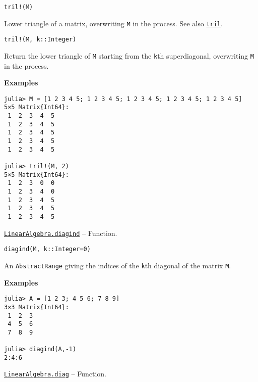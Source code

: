 \begin{adjustwidth}{2em}{0pt}


\begin{verbatim}
tril!(M)
\end{verbatim}

Lower triangle of a matrix, overwriting \texttt{M} in the process. See also \hyperlink{6919124555890239966}{\texttt{tril}}.




\begin{lstlisting}
tril!(M, k::Integer)
\end{lstlisting}

Return the lower triangle of \texttt{M} starting from the \texttt{k}th superdiagonal, overwriting \texttt{M} in the process.

\textbf{Examples}


\begin{verbatim}
julia> M = [1 2 3 4 5; 1 2 3 4 5; 1 2 3 4 5; 1 2 3 4 5; 1 2 3 4 5]
5×5 Matrix{Int64}:
 1  2  3  4  5
 1  2  3  4  5
 1  2  3  4  5
 1  2  3  4  5
 1  2  3  4  5

julia> tril!(M, 2)
5×5 Matrix{Int64}:
 1  2  3  0  0
 1  2  3  4  0
 1  2  3  4  5
 1  2  3  4  5
 1  2  3  4  5
\end{verbatim}



\end{adjustwidth}
\hypertarget{16168870718733561340}{}
\hyperlink{16168870718733561340}{\texttt{LinearAlgebra.diagind}}  -- {Function.}

\begin{adjustwidth}{2em}{0pt}


\begin{verbatim}
diagind(M, k::Integer=0)
\end{verbatim}

An \texttt{AbstractRange} giving the indices of the \texttt{k}th diagonal of the matrix \texttt{M}.

\textbf{Examples}


\begin{verbatim}
julia> A = [1 2 3; 4 5 6; 7 8 9]
3×3 Matrix{Int64}:
 1  2  3
 4  5  6
 7  8  9

julia> diagind(A,-1)
2:4:6
\end{verbatim}



\end{adjustwidth}
\hypertarget{17079356950356685026}{}
\hyperlink{17079356950356685026}{\texttt{LinearAlgebra.diag}}  -- {Function.}

